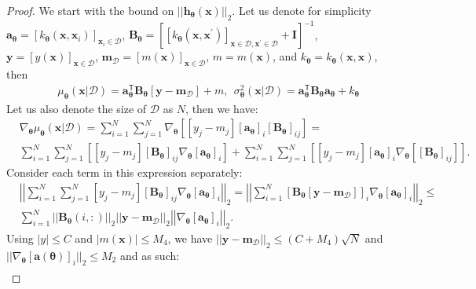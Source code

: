 \documentclass[jair,twoside,11pt,theapa]{article}
\theoremstyle{definition}
\begin{document}
\begin{proof}
We start with the bound on $||\bm{h}_{\bm{\theta}}(\bm{x})||_2$. Let us denote for simplicity $\bm{a}_{\bm{\theta}} = [k_{\bm{\theta}}(\bm{x},\bm{x}_i)]_{\bm{x}_i\in\mathcal{D}}$, $\bm{B}_{\bm{\theta}} = \left[\left[k_{\bm{\theta}}(\bm{x},\bm{x}^{\prime})\right]_{\bm{x}\in\mathcal{D},\bm{x}^{\prime}\in\mathcal{D}}+ \bm{I}\right]^{-1}$, $\bm{y} = [y(\bm{x})]_{\bm{x\in\mathcal{D}}}$,  $\bm{m}_{\mathcal{D}} = [m(\bm{x})]_{\bm{x}\in\mathcal{D}}$, $m = m(\bm{x})$, and $k_{\bm{\theta}} = k_{\bm{\theta}}(\bm{x},\bm{x})$, then
\begin{align*}
    &\mu_{\bm{\theta}}(\bm{x}|\mathcal{D}) = \bm{a}^{\mathsf{T}}_{\bm{\theta}}\bm{B}_{\bm{\theta}}[\bm{y} - \bm{m}_{\mathcal{D}}] + m,\ \ \nonumber
    \sigma^2_{\bm{\theta}}(\bm{x}|\mathcal{D}) = \bm{a}_{\bm{\theta}}^{\mathsf{T}}\bm{B}_{\bm{\theta}}\bm{a}_{\bm{\theta}} + k_{\bm{\theta}}
\end{align*}
Let us also denote the size of $\mathcal{D}$ as $N$, then we have:
\begin{align*}
    &\nabla_{\boldsymbol{\theta}}\mu_{\bm{\theta}}(\bm{x}|\mathcal{D}) = \sum_{i=1}^N\sum_{j=1}^N\nabla_{\bm{\theta}}\left[[y_j - m_j][\bm{a}_{\bm{\theta}}]_i[\boldsymbol{B}_{\bm{\theta}}]_{ij}\right] = \\\nonumber
    &\sum_{i=1}^N\sum_{j=1}^N\left[[y_j - m_j][\bm{B}_{\bm{\theta}}]_{ij}\nabla_{\bm{\theta}}[\bm{a}_{\bm{\theta}}]_i\right]+\nonumber
    \sum_{i=1}^N\sum_{j=1}^N\left[[y_j - m_j][\bm{a}_{\bm{\theta}}]_i\nabla_{\bm{\theta}}[[\bm{B}_{\bm{\theta}}]_{ij}]\right].
\end{align*}
Consider each term in this expression separately:
\begin{align*}
    &\left|\left|\sum_{i=1}^N\sum_{j=1}^N[y_j - m_j][\bm{B}_{\bm{\theta}}]_{ij}\nabla_{\bm{\theta}}[\bm{a}_{\bm{\theta}}]_i\right|\right|_2 = \nonumber
    \left|\left|\sum_{i=1}^N[\bm{B}_{\bm{\theta}}[\bm{y} - \bm{m}_{\mathcal{D}}]]_{i}\nabla_{\bm{\theta}}[\bm{a}_{\bm{\theta}}]_i\right|\right|_2 \le \\\nonumber
    &\sum_{i=1}^N||\bm{B}_{\bm{\theta}}(i,:)||_2||\bm{y} - \bm{m}_{\mathcal{D}}||_2\left|\left|\nabla_{\bm{\theta}}[\bm{a}_{\bm{\theta}}]_i\right|\right|_2.
\end{align*}
Using $|y|\le C$ and $|m(\boldsymbol{x})|\le M_4$, we have $||\bm{y} - \bm{m}_{\mathcal{D}}||_2 \le (C+M_4)\sqrt{N}$ and $||\nabla_{\boldsymbol{\theta}}[\boldsymbol{a}(\boldsymbol{\theta})]_i||_2\le M_2$ and as such:
\begin{align}

\end{align}
\end{proof}
\end{document}
